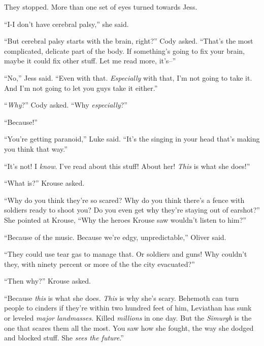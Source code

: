 They stopped.  More than one set of eyes turned towards Jess.



``I-I don't have cerebral palsy,'' she said.



``But cerebral palsy starts with the brain, right?'' Cody asked.  ``That's the most complicated, delicate part of the body.  If something's going to fix your brain, maybe it could fix other stuff.  Let me read more, it's--''



``No,'' Jess said.  ``Even with that.  \emph{Especially} with that, I'm not going to take it.  And I'm not going to let you guys take it either.''



``\emph{Why}?'' Cody asked.  ``Why \emph{especially}?''



``Because!''



``You're getting paranoid,'' Luke said.  ``It's the singing in your head that's making you think that way.''



``It's not!  I \emph{know}.  I've read about this stuff!  About her!  \emph{This} is what she does!''



``What is?'' Krouse asked.



``Why do you think they're so scared?  Why do you think there's a fence with soldiers ready to shoot you?  Do you even get why they're staying out of earshot?''  She pointed at Krouse, ``Why the heroes Krouse saw wouldn't listen to him?''



``Because of the music.  Because we're edgy, unpredictable,'' Oliver said.



``They could use tear gas to manage that.  Or soldiers and guns!  Why couldn't they, with ninety percent or more of the the city evacuated?''



``Then why?'' Krouse asked.



``Because \emph{this} is what she does.  \emph{This} is why she's scary.  Behemoth can turn people to cinders if they're within two hundred feet of him, Leviathan has sunk or leveled \emph{major landmasses.  }Killed\emph{ millions }in one day.  But the \emph{Simurgh }is the one that scares them all the most.  You saw how she fought, the way she dodged and blocked stuff.  She \emph{sees the future}.''



